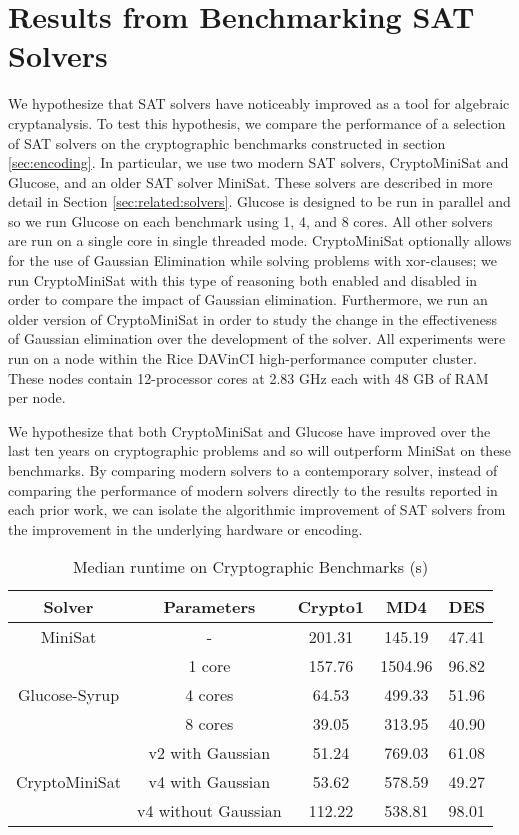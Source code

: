 \section{Results from Benchmarking SAT Solvers}
\label{sec:results}

We hypothesize that SAT solvers have noticeably improved as a tool for algebraic cryptanalysis. To test this hypothesis, we compare the performance of a selection of SAT solvers on the cryptographic benchmarks constructed in section \ref{sec:encoding}. In particular, we use two modern SAT solvers, CryptoMiniSat and Glucose, and an older SAT solver MiniSat. These solvers are described in more detail in Section \ref{sec:related:solvers}. Glucose is designed to be run in parallel and so we run Glucose on each benchmark using 1, 4, and 8 cores. All other solvers are run on a single core in single threaded mode. CryptoMiniSat optionally allows for the use of Gaussian Elimination while solving problems with xor-clauses; we run CryptoMiniSat with this type of reasoning both enabled and disabled in order to compare the impact of Gaussian elimination. Furthermore, we run an older version of CryptoMiniSat in order to study the change in the effectiveness of Gaussian elimination over the development of the solver. All experiments were run on a node within the Rice DAVinCI high-performance computer cluster. These nodes contain 12-processor cores at 2.83 GHz each with 48 GB of RAM per node.

We hypothesize that both CryptoMiniSat and Glucose have improved over the last ten years on cryptographic problems and so will outperform MiniSat on these benchmarks. By comparing modern solvers to a contemporary solver, instead of comparing the performance of modern solvers directly to the results reported in each prior work, we can isolate the algorithmic improvement of SAT solvers from the improvement in the underlying hardware or encoding.

\begin{table}[!htbp]
	\centering
	\begin{tabular}{|c|c|c|c|c|}
		\hline
		\textbf{Solver} & \textbf{Parameters} & \textbf{Crypto1} & \textbf{MD4} & \textbf{DES}\\
		\hline
		MiniSat & - & 201.31 & 145.19 & 47.41\\
		\hline
		\multirow{3}{*}{Glucose-Syrup} & 1 core & 157.76 & 1504.96 & 96.82 \\ \cline{2-5}
		& 4 cores & 64.53 & 499.33 & 51.96 \\ \cline{2-5}
		& 8 cores & 39.05 & 313.95 & 40.90 \\
		\hline
		
		\multirow{3}{*}{CryptoMiniSat} & v2 with Gaussian & 51.24 & 769.03 & 61.08 \\ \cline{2-5}
		& v4 with Gaussian & 53.62 & 578.59 & 49.27 \\ \cline{2-5}
		& v4 without Gaussian & 112.22 & 538.81 & 98.01 \\
		\hline
	\end{tabular}
	
	\caption{Median runtime on Cryptographic Benchmarks (s)}
	\label{table:all:runtime}
\end{table}

